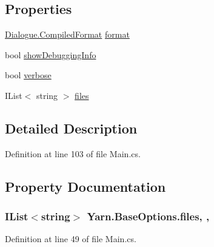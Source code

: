 \subsection*{Properties}
\begin{DoxyCompactItemize}
\item 
\hyperlink{a00090_a903f18cdcc66c28ceab5a43c41fe074d}{Dialogue.\-Compiled\-Format} \hyperlink{a00054_a9904ccfb1b0ff64df415c4fc9fe6eb1c}{format}
\item 
bool \hyperlink{a00042_a89964ea17bd19caf00cb5bff563ed01c}{show\-Debugging\-Info}
\item 
bool \hyperlink{a00042_ada4d83d1756918f362d55f6649b82b17}{verbose}
\item 
I\-List$<$ string $>$ \hyperlink{a00042_aa93cbb1bc1d5328e0a417012621e92d2}{files}
\end{DoxyCompactItemize}


\subsection{Detailed Description}


Definition at line 103 of file Main.\-cs.



\subsection{Property Documentation}
\hypertarget{a00042_aa93cbb1bc1d5328e0a417012621e92d2}{
\subsubsection[{files}]{\setlength{\rightskip}{0pt plus 5cm}I\-List$<$string$>$ Yarn.\-Base\-Options.\-files\hspace{0.3cm}{\ttfamily [get]}, {\ttfamily [set]}, {\ttfamily [inherited]}}}\label{a00042_aa93cbb1bc1d5328e0a417012621e92d2}


Definition at line 49 of file Main.\-cs.



